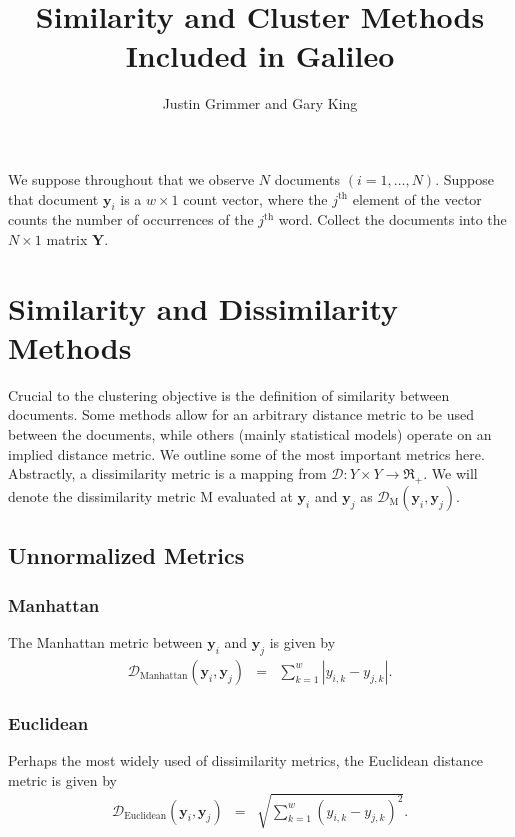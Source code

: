 \documentclass[11pt,letterpaper]{article}
\title{Similarity and Cluster Methods Included in Galileo}
\author{Justin Grimmer and Gary King}
\numberwithin{equation}{section}
\begin{document}
\maketitle


\tableofcontents
\bigskip

We suppose throughout that we observe $N$ documents $(i=1, \hdots,
N)$.  Suppose that document $\boldsymbol{y}_i$ is a $w \times 1$
count vector, where the $j^{\text{th}}$ element of the vector counts
the number of occurrences of the $j^{\text{th}}$ word.  Collect the
documents into the $N \times 1$ matrix $\boldsymbol{Y}$.

\section{Similarity and Dissimilarity Methods}
Crucial to the clustering objective is the definition of similarity
between documents.  Some methods allow for an arbitrary distance
metric to be used between the documents, while others (mainly
statistical models) operate on an implied distance metric.  We
outline some of the most important metrics here.  \\
\indent Abstractly, a dissimilarity metric is a mapping from
$\mathcal{D}: Y \times Y \rightarrow \Re_+$.  We will denote the
dissimilarity metric $\text{M}$ evaluated at $\boldsymbol{y}_i$ and
$\boldsymbol{y}_j$ as $\mathcal{D}_{\text{M}} (\boldsymbol{y}_i,
\boldsymbol{y}_j).$
\subsection{Unnormalized Metrics}


\subsubsection{Manhattan} The Manhattan metric between
$\boldsymbol{y}_i$ and $\boldsymbol{y}_j$ is given by
\begin{eqnarray}
\mathcal{D}_{\text{Manhattan}}(\boldsymbol{y}_i,\boldsymbol{y}_j ) &
= & \sum_{k=1}^{w} |y_{i,k} - y_{j,k}  |. \nonumber
\end{eqnarray}
\subsubsection{Euclidean}
Perhaps the most widely used of dissimilarity metrics, the Euclidean
distance metric  is given by
\begin{eqnarray}
\mathcal{D}_{\text{Euclidean}}(\boldsymbol{y}_i,\boldsymbol{y}_j ) &
= & \sqrt{\sum_{k=1}^{w} (y_{i,k} - y_{j,k} )^{2} }. \nonumber
\end{eqnarray}
\end{document}
